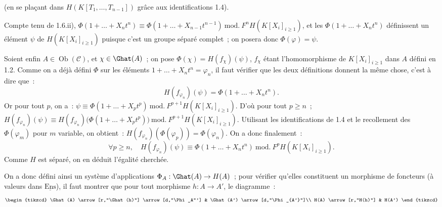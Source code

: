 
(en se plaçant
dans \(H(K[T_1,\ldots,T_{n-1}])\) grâce aux identifications 1.4).

Compte tenu de 1.6.ii), \(\Phi(1+\ldots+X_nt^n)\equiv\Phi(1+\ldots+X_{n-1}t^{n-1})\ \mathrm{mod.}\ F^nH(K[X_i]_{i\geq1})\), et les \(\Phi(1+\ldots+X_nt^n)\) définissent un élément \(\psi\) de \(H(K[X_i]_{i\geq1})\) puisque c'est un groupe séparé complet~; on posera donc \(\Phi(\varphi)=\psi\).

Soient enfin \(A\in\operatorname{Ob}(\mathcal C)\), et \(\chi\in\Ghat(A)\)~; on pose \(\Phi(\chi)=H(f_\chi)(\psi)\), \(f_\chi\) étant l'homomorphisme de \(K[X_i]_{i\geq 1}\) dans \(A\) défini en 1.2. Comme on a déjà défini \(\Phi\) sur les éléments \(1+\ldots+X_nt^n=\varphi_n\), il faut vérifier que les deux définitions donnent la même chose, c'est à dire que~:
\[
  H(f_{\varphi_n})(\psi)=\Phi(1+\ldots+X_nt^n).
\]
Or pour tout \(p\), on a~: \(\psi\equiv \Phi(1+\ldots+X_pt^p)\ \mathrm{mod.}\ F^{p+1}H(K[X_i]_{i\geq 1})\). D'où pour tout \(p\geq n\)~; \(H(f_{\varphi_n})(\psi)\equiv H(f_{\varphi_n})\bigl(\Phi(1+\ldots+X_pt^p)\bigr)\ \mathrm{mod.}\ F^{p+1}H(K[X_i]_{i\geq 1})\). Utilisant les identifications de 1.4 et le recollement des \(\Phi(\varphi_m)\) pour \(m\) variable, on obtient~: \(H(f_{\varphi_n})(\Phi(\varphi_p))=\Phi(\varphi_n)\).
On a donc finalement~:
\[
  \forall p\geq n,\quad
  H(f_{\varphi_n})(\psi)\equiv \Phi(1+\ldots+X_nt^n)
  \ \mathrm{mod.}\ F^pH(K[X_i]_{i\geq 1}).
\]
Comme \(H\) est séparé, on en déduit l'égalité cherchée.

On a donc défini ainsi un système d'applications \(\Phi_A:\Ghat(A)\to H(A)\)~; pour vérifier qu'elles constituent un morphisme de foncteurs (à valeurs dans \(\underline{\mathrm{Ens}}\)), il faut montrer que pour tout morphisme \(h:A\to A'\), le diagramme~:
\[
\begin{tikzcd}
\Ghat(A) \arrow[r,"\Ghat(h)"] \arrow[d,"\Phi_A"'] &
\Ghat(A') \arrow[d,"\Phi_{A'}"]\\
H(A) \arrow[r,"H(h)"] & H(A')
\end{tikzcd}
\]
